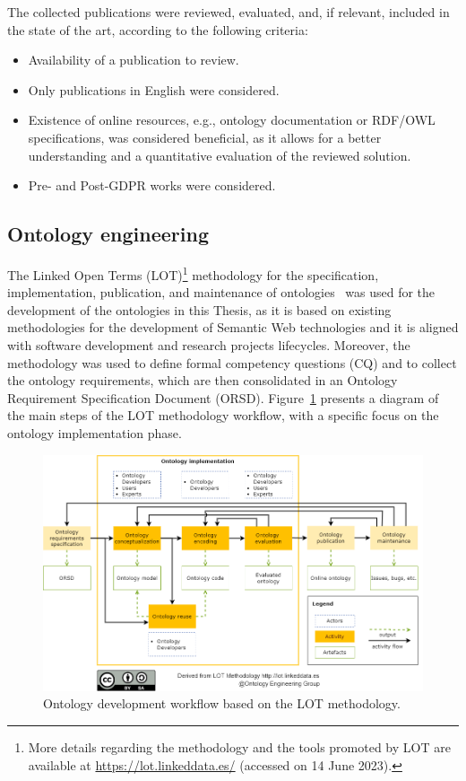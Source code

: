 The collected publications were reviewed, evaluated, and, if relevant, included in the state of the art, according to the following criteria:

\begin{itemize}
\item Availability of a publication to review.
\item Only publications in English were considered.
\item Existence of online resources, e.g., ontology documentation or RDF/OWL specifications, was considered beneficial, as it allows for a better understanding and a quantitative evaluation of the reviewed solution.
\item Pre- and Post-GDPR works were considered.
\end{itemize}

\subsection{Ontology engineering}
\label{sec:ontology_engineering}

The Linked Open Terms (LOT)\footnote{More details regarding the methodology and the tools promoted by LOT are available at \url{https://lot.linkeddata.es/} (accessed on 14 June 2023).} methodology for the specification, implementation, publication, and maintenance of ontologies~\citep{poveda-villalon_lot_2022} was used for the development of the ontologies in this Thesis, as it is based on existing methodologies for the development of Semantic Web technologies and it is aligned with software development and research projects lifecycles.
Moreover, the~\cite{suarez-figueroa_neon_2012} methodology was used to define formal competency questions (CQ) and to collect the ontology requirements, which are then consolidated in an Ontology Requirement Specification Document (ORSD).
Figure~\ref{fig:lot} presents a diagram of the main steps of the LOT methodology workflow, with a specific focus on the ontology implementation phase.

\begin{figure}
    \centering
    \includegraphics[width=\linewidth]{figures/chapter-3/LOT.png}
    \caption{Ontology development workflow based on the LOT methodology.}
    \label{fig:lot}
\end{figure}

